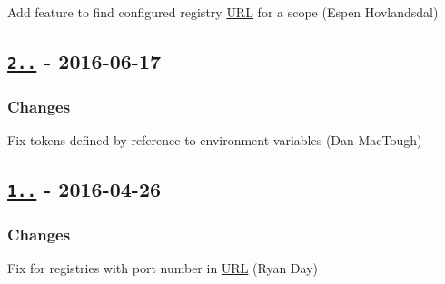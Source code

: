 \begin{DoxyItemize}
\item Add feature to find configured registry \mbox{\hyperlink{namespace_u_r_l}{U\+RL}} for a scope (Espen Hovlandsdal)
\end{DoxyItemize}

\subsection*{\href{https://github.com/rexxars/registry-auth-token/compare/v1.1.1...v2.0.0}{\tt 2..} -\/ 2016-\/06-\/17}

\subsubsection*{Changes}


\begin{DoxyItemize}
\item Fix tokens defined by reference to environment variables (Dan Mac\+Tough)
\end{DoxyItemize}

\subsection*{\href{https://github.com/rexxars/registry-auth-token/compare/a5b4fe2f5ff982110eb8a813ba1b3b3c5d851af1...v1.1.1}{\tt 1..} -\/ 2016-\/04-\/26}

\subsubsection*{Changes}


\begin{DoxyItemize}
\item Fix for registries with port number in \mbox{\hyperlink{namespace_u_r_l}{U\+RL}} (Ryan Day) 
\end{DoxyItemize}